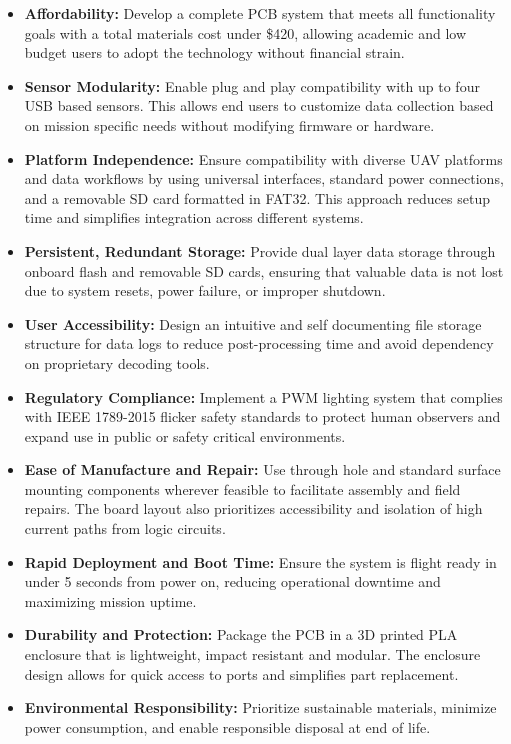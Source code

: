 \documentclass[12pt]{article}
\begin{document}
\begin{itemize}
\item \textbf{Affordability:} Develop a complete PCB system that meets all functionality goals with a total materials cost under \$420, allowing academic and low budget users to adopt the technology without financial strain.

\item \textbf{Sensor Modularity:} Enable plug and play compatibility with up to four USB based sensors. This allows end users to customize data collection based on mission specific needs without modifying firmware or hardware.

\item \textbf{Platform Independence:} Ensure compatibility with diverse UAV platforms and data workflows by using universal interfaces, standard power connections, and a removable SD card formatted in FAT32. This approach reduces setup time and simplifies integration across different systems.

\item \textbf{Persistent, Redundant Storage:} Provide dual layer data storage through onboard flash and removable SD cards, ensuring that valuable data is not lost due to system resets, power failure, or improper shutdown.

\item \textbf{User Accessibility:} Design an intuitive and self documenting file storage structure for data logs to reduce post-processing time and avoid dependency on proprietary decoding tools.

\item \textbf{Regulatory Compliance:} Implement a PWM lighting system that complies with IEEE 1789-2015 flicker safety standards to protect human observers and expand use in public or safety critical environments.

\item \textbf{Ease of Manufacture and Repair:} Use through hole and standard surface mounting components wherever feasible to facilitate assembly and field repairs. The board layout also prioritizes accessibility and isolation of high current paths from logic circuits.

\item \textbf{Rapid Deployment and Boot Time:} Ensure the system is flight ready in under 5 seconds from power on, reducing operational downtime and maximizing mission uptime.

\item \textbf{Durability and Protection:} Package the PCB in a 3D printed PLA enclosure that is lightweight, impact resistant and modular. The enclosure design allows for quick access to ports and simplifies part replacement.

\item \textbf{Environmental Responsibility:} Prioritize sustainable materials, minimize power consumption, and enable responsible disposal at end of life.

\end{itemize}
\end{document}
